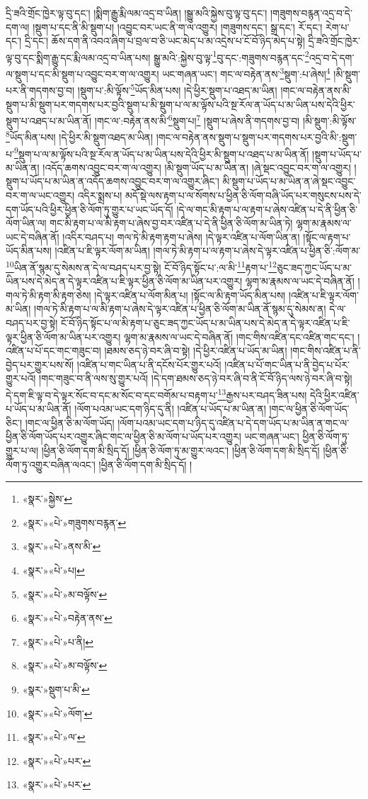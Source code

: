 དྲི་ཟའི་གྲོང་ཁྱེར་ལྟ་བུ་དང་། །སྨིག་རྒྱུ་རྨི་ལམ་འདྲ་བ་ཡིན། །སྒྱུ་མའི་སྐྱེས་བུ་ལྟ་བུ་དང་། །གཟུགས་བརྙན་འདྲ་བ་དེ་དག་ལ། །སྡུག་པ་དང་ནི་མི་སྡུག་པ། །འབྱུང་བར་ཡང་ནི་ག་ལ་འགྱུར། །གཟུགས་དང་། སྒྲ་དང་། རོ་དང་། རེག་པ་དང་། དྲི་དང་། ཆོས་དག་ནི་འབའ་ཞིག་པ་བྲལ་བ་ཅི་ཡང་མེད་པ་མ་འདྲེས་པ་ངོ་བོ་ཉིད་མེད་པ་སྟེ། དྲི་ཟའི་གྲོང་ཁྱེར་ལྟ་བུ་དང་སྨིག་རྒྱུ་དང་རྨི་ལམ་འདྲ་བ་ཡིན་པས། སྒྱུ་མའི་:སྐྱེས་བུ་ལྟ་\footnote{«སྣར་»སྐྱེས་}བུ་དང་:གཟུགས་བརྙན་དང་\footnote{«སྣར་»«པེ་»གཟུགས་བརྙན་}འདྲ་བ་དེ་དག་ལ་སྡུག་པ་དང་མི་སྡུག་པ་འབྱུང་བར་ག་ལ་འགྱུར། ཡང་གཞན་ཡང་། གང་ལ་བརྟེན་ནས་\footnote{«སྣར་»«པེ་»ནས་མི་}སྡུག་:པ་ཞེས།\footnote{«སྣར་»«པེ་»པ།} །མི་སྡུག་པར་ནི་གདགས་བྱ་བ། །སྡུག་པ་:མི་ལྟོས་\footnote{«སྣར་»«པེ་»མ་བལྟོས་}ཡོད་མིན་པས། །དེ་ཕྱིར་སྡུག་པ་འཐད་མ་ཡིན། །གང་ལ་བརྟེན་ནས་མི་སྡུག་པ་མི་སྡུག་པར་གདགས་པར་བྱའི་སྡུག་པ་མི་སྡུག་པ་ལ་མ་ལྟོས་པའི་སྔ་རོལ་ན་ཡོད་པ་མ་ཡིན་པས་དེའི་ཕྱིར་སྡུག་པ་འཐད་པ་མ་ཡིན་ནོ། །གང་ལ་:བརྟེན་ནས་མི་\footnote{«སྣར་»«པེ་»བརྟེན་ནས་}སྡུག་པ།\footnote{«སྣར་»«པེ་»པ་ནི།} །སྡུག་པ་ཞེས་ནི་གདགས་བྱ་བ། །མི་སྡུག་:མི་ལྟོས་\footnote{«སྣར་»«པེ་»མ་བལྟོས་}ཡོད་མིན་པས། །དེ་ཕྱིར་མི་སྡུག་འཐད་མ་ཡིན། །གང་ལ་བརྟེན་ནས་སྡུག་པ་སྡུག་པར་གདགས་པར་བྱའི་མི་:སྡུག་པ་\footnote{«སྣར་»སྡུག་པ་མི་}སྡུག་པ་ལ་མ་ལྟོས་པའི་སྔ་རོལ་ན་ཡོད་པ་མ་ཡིན་པས་དེའི་ཕྱིར་མི་སྡུག་པ་འཐད་པ་མ་ཡིན་ནོ། །སྡུག་པ་ཡོད་པ་མ་ཡིན་ན། །འདོད་ཆགས་འབྱུང་བར་ག་ལ་འགྱུར། །མི་སྡུག་ཡོད་པ་མ་ཡིན་ན། །ཞེ་སྡང་འབྱུང་བར་ག་ལ་འགྱུར། །སྡུག་པ་ཡོད་པ་མ་ཡིན་ན་འདོད་ཆགས་འབྱུང་བར་ག་ལ་འགྱུར་ཞིང་། མི་སྡུག་པ་ཡོད་པ་མ་ཡིན་ན་ཞེ་སྡང་འབྱུང་བར་ག་ལ་ཡང་འགྱུར། འདིར་སྨྲས་པ། མདོ་སྡེ་ལས་རྟག་པ་ལ་སོགས་པ་ཕྱིན་ཅི་ལོག་བཞི་ཡོད་པར་གསུངས་པས་དེ་དག་ཡོད་པའི་ཕྱིར་ཕྱིན་ཅི་ལོག་ཏུ་གྱུར་པ་ཡང་ཡོད་དོ། །དེ་ལ་གང་མི་རྟག་པ་ལ་རྟག་པ་ཞེས་འཛིན་པ་དེ་ནི་ཕྱིན་ཅི་ལོག་ཡིན་ལ། གང་མི་རྟག་པ་ལ་མི་རྟག་པ་ཞེས་བྱ་བར་འཛིན་པ་དེ་ནི་ཕྱིན་ཅི་ལོག་མ་ཡིན་ཏེ། ལྷག་མ་རྣམས་ལ་ཡང་དེ་བཞིན་ནོ། །འདིར་བཤད་པ། གལ་ཏེ་མི་རྟག་རྟག་པ་ཞེས། །དེ་ལྟར་འཛིན་པ་ལོག་ཡིན་ན། །སྟོང་ལ་རྟག་པ་ཡོད་མིན་པས། །འཛིན་པ་ཇི་ལྟར་ལོག་མ་ཡིན། །གལ་ཏེ་མི་རྟག་པ་ལ་རྟག་པ་ཞེས་དེ་ལྟར་འཛིན་པ་ཕྱིན་ཅི་:ལོག་མ་\footnote{«སྣར་»«པེ་»ལོག་}ཡིན་ནོ་སྙམ་དུ་སེམས་ན་དེ་ལ་བཤད་པར་བྱ་སྟེ། ངོ་བོ་ཉིད་སྟོང་པ་:ལ་མི་\footnote{«སྣར་»«པེ་»ལ་}རྟག་པ་\footnote{«སྣར་»«པེ་»པར་}ཅུང་ཟད་ཀྱང་ཡོད་པ་མ་ཡིན་པས་དེ་མེད་ན་དེ་ལྟར་འཛིན་པ་ཇི་ལྟར་ཕྱིན་ཅི་ལོག་མ་ཡིན་པར་འགྱུར། ལྷག་མ་རྣམས་ལ་ཡང་དེ་བཞིན་ནོ། །གལ་ཏེ་མི་རྟག་མི་རྟག་ཅེས། །དེ་ལྟར་འཛིན་པ་ལོག་མིན་པ། །སྟོང་ལ་མི་རྟག་ཡོད་མིན་པས། །འཛིན་པ་ཇི་ལྟར་ལོག་མ་ཡིན། །གལ་ཏེ་མི་རྟག་པ་ལ་མི་རྟག་པ་ཞེས་དེ་ལྟར་འཛིན་པ་ཕྱིན་ཅི་ལོག་མ་ཡིན་ནོ་སྙམ་དུ་སེམས་ན། དེ་ལ་བཤད་པར་བྱ་སྟེ། ངོ་བོ་ཉིད་སྟོང་པ་ལ་མི་རྟག་པ་ཅུང་ཟད་ཀྱང་ཡོད་པ་མ་ཡིན་པས་དེ་མེད་ན་དེ་ལྟར་འཛིན་པ་ཇི་ལྟར་ཕྱིན་ཅི་ལོག་མ་ཡིན་པར་འགྱུར། ལྷག་མ་རྣམས་ལ་ཡང་དེ་བཞིན་ནོ། །གང་གིས་འཛིན་དང་འཛིན་གང་དང་། །འཛིན་པ་པོ་དང་གང་གཟུང་བ། །ཐམས་ཅད་ཉེ་བར་ཞི་བ་སྟེ། །དེ་ཕྱིར་འཛིན་པ་ཡོད་མ་ཡིན། །གང་གིས་འཛིན་པ་ནི་བྱེད་པར་གྱུར་པས་སོ། །འཛིན་པ་གང་ཡིན་པ་ནི་དངོས་པོར་གྱུར་པའོ། །འཛིན་པ་པོ་གང་ཡིན་པ་ནི་བྱེད་པ་པོར་གྱུར་པའོ། །གང་གཟུང་བ་ནི་ལས་སུ་གྱུར་པའོ། །དེ་དག་ཐམས་ཅད་ཉེ་བར་ཞི་བ་ནི་ངོ་བོ་ཉིད་ལས་ཉེ་བར་ཞི་བ་སྟེ། དེ་དག་ཇི་ལྟ་བ་དེ་ལྟར་སོང་བ་དང་མ་སོང་བ་དང་བགོམ་པ་བརྟག་པ་\footnote{«སྣར་»«པེ་»པར་}རྒྱས་པར་བཤད་ཟིན་པས། དེའི་ཕྱིར་འཛིན་པ་ཡོད་པ་མ་ཡིན་ནོ། །ལོག་པའམ་ཡང་དག་ཉིད་དུ་ནི། །འཛིན་པ་ཡོད་པ་མ་ཡིན་ན། །གང་ལ་ཕྱིན་ཅི་ལོག་ཡོད་ཅིང་། །གང་ལ་ཕྱིན་ཅི་མ་ལོག་ཡོད། །ལོག་པའམ་ཡང་དག་པ་ཉིད་དུ་འཛིན་པ་དེ་དག་ཡོད་པ་མ་ཡིན་ན་གང་ལ་ཕྱིན་ཅི་ལོག་ཡོད་པར་འགྱུར་ཞིང་གང་ལ་ཕྱིན་ཅི་མ་ལོག་པ་ཡོད་པར་འགྱུར། ཡང་གཞན་ཡང་། ཕྱིན་ཅི་ལོག་ཏུ་གྱུར་པ་ལ། །ཕྱིན་ཅི་ལོག་དག་མི་སྲིད་དོ། །ཕྱིན་ཅི་ལོག་ཏུ་མ་གྱུར་ལའང་། །ཕྱིན་ཅི་ལོག་དག་མི་སྲིད་དོ། །ཕྱིན་ཅི་ལོག་ཏུ་འགྱུར་བཞིན་ལའང་། །ཕྱིན་ཅི་ལོག་དག་མི་སྲིད་དོ། །
